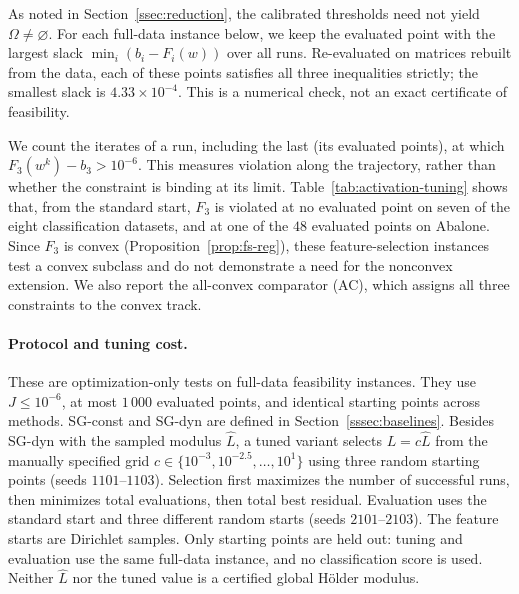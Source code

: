 \documentclass[]{interact}
\theoremstyle{plain}
\theoremstyle{definition}
\theoremstyle{remark}
\begin{document}
As noted in Section~\ref{ssec:reduction}, the calibrated thresholds need not yield
$\Omega\ne\varnothing$. For each full-data instance below, we keep the evaluated point with the largest slack
$\min_i(b_i-F_i(w))$ over all runs. Re-evaluated on matrices rebuilt from the data, each of
these points satisfies all three inequalities strictly; the smallest slack is
$4.33\times10^{-4}$. This is a numerical check, not an exact certificate of feasibility.

We count the iterates of a run, including the last (its evaluated points), at which
$F_3(w^k)-b_3>10^{-6}$. This measures violation along the trajectory, rather than whether the
constraint is binding at its limit. Table~\ref{tab:activation-tuning} shows that, from the
standard start, $F_3$ is violated at no evaluated point on seven of the eight classification
datasets, and at one of the $48$ evaluated points on Abalone. Since $F_3$ is convex
(Proposition~\ref{prop:fs-reg}), these feature-selection instances test a convex subclass and
do not demonstrate a need for the nonconvex extension. We also report the all-convex
comparator (AC), which assigns all three constraints to the convex track.

\paragraph*{Protocol and tuning cost.}
These are optimization-only tests on full-data feasibility instances.
They use $J\le10^{-6}$, at most $1\,000$ evaluated points, and identical
starting points across methods. SG-const and SG-dyn are defined in Section~\ref{sssec:baselines}. Besides SG-dyn with the
sampled modulus $\widehat L$, a tuned variant selects $L=c\widehat L$ from the manually specified grid
$c\in\{10^{-3},10^{-2.5},\ldots,10^1\}$ using three random starting
points (seeds $1101$--$1103$). Selection first maximizes the number of
successful runs, then minimizes total evaluations, then total best residual.
Evaluation uses the standard start and three different random starts
(seeds $2101$--$2103$). The feature starts are Dirichlet samples.
Only starting points are held out: tuning and evaluation use the same
full-data instance, and no classification score is used. Neither
$\widehat L$ nor the tuned value is a certified global H\"older modulus.
\end{document}
